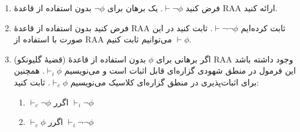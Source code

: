 \begin{enumerate}[label=(\alph*)]
    \item فرض کنید $\vdash\neg\phi$. یک برهان برای $\neg\phi$ بدون استفاده از قاعدهٔ {RAA} ارائه کنید.
    \item فرض کنید بدون استفاده از قاعدهٔ {RAA} ثابت کرده‌ایم $\vdash\neg\neg\phi$. ثابت کنید در این صورت با استفاده از {RAA} می‌توانیم ثابت کنیم $\vdash\phi$.
    \item(قضیهٔ گلیونکو) اگر برهانی برای $\phi$ بدون استفاده از قاعدهٔ {RAA} وجود داشته باشد این فرمول در منطق شهودی گزاره‌ای قابل اثبات است و می‌نویسیم $\vdash_i\phi$. همچنین برای اثبات‌پذیری در منطق گزاره‌ای کلاسیک می‌نویسیم $\vdash_c\phi$. ثابت کنید:
    \begin{enumerate}[label=(\textit{\roman*})]
        \item $\vdash_c\neg\phi$ اگرر $\vdash_i\neg\phi$
        \item $\vdash_c\phi$ اگرر $\vdash_i\neg\neg\phi$
    \end{enumerate}
\end{enumerate}